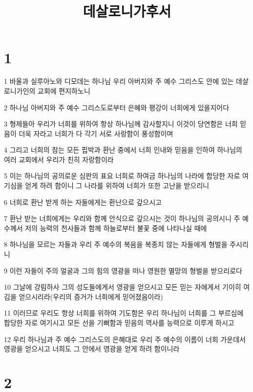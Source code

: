 

\title{데살로니가후서}


\chapter{1}

\par 1 바울과 실루아노와 디모데는 하나님 우리 아버지와 주 예수 그리스도 안에 있는 데살로니가인의 교회에 편지하노니
\par 2 하나님 아버지와 주 예수 그리스도로부터 은혜와 평강이 너희에게 있을지어다
\par 3 형제들아 우리가 너희를 위하여 항상 하나님께 감사할지니 이것이 당연함은 너희 믿음이 더욱 자라고 너희가 다 각기 서로 사랑함이 풍성함이며
\par 4 그리고 너희의 참는 모든 핍박과 환난 중에서 너희 인내와 믿음을 인하여 하나님의 여러 교회에서 우리가 친히 자랑함이라
\par 5 이는 하나님의 공의로운 심판의 표요 너희로 하여금 하나님의 나라에 합당한 자로 여기심을 얻게 하려 함이니 그 나라를 위하여 너희가 또한 고난을 받으리니
\par 6 너희로 환난 받게 하는 자들에게는 환난으로 갚으시고
\par 7 환난 받는 너희에게는 우리와 함께 안식으로 갚으시는 것이 하나님의 공의시니 주 예수께서 저의 능력의 천사들과 함께 하늘로부터 불꽃 중에 나타나실 때에
\par 8 하나님을 모르는 자들과 우리 주 예수의 복음을 복종치 않는 자들에게 형벌을 주시리니
\par 9 이런 자들이 주의 얼굴과 그의 힘의 영광을 떠나 영원한 멸망의 형벌을 받으리로다
\par 10 그날에 강림하사 그의 성도들에게서 영광을 얻으시고 모든 믿는 자에게서 기이히 여김을 얻으시리라(우리의 증거가 너희에게 믿어졌음이라)
\par 11 이러므로 우리도 항상 너희를 위하여 기도함은 우리 하나님이 너희를 그 부르심에 합당한 자로 여기시고 모든 선을 기뻐함과 믿음의 역사를 능력으로 이루게 하시고
\par 12 우리 하나님과 주 예수 그리스도의 은혜대로 우리 주 예수의 이름이 너희 가운데서 영광을 얻으시고 너희도 그 안에서 영광을 얻게 하려 함이니라

\chapter{2}

